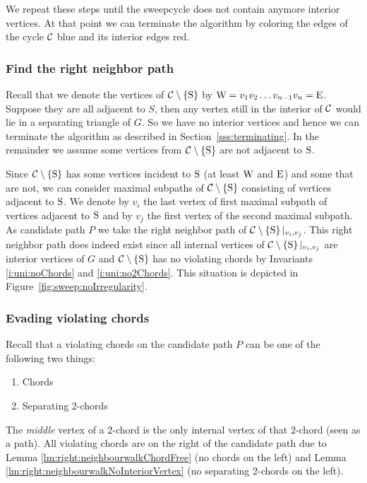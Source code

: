 We repeat these steps until the sweepcycle does not contain anymore interior vertices.
At that point we can terminate the algorithm by coloring the edges of the cycle $\mathcal{C}$ blue and its interior edges red.

\subsubsection{Find the right neighbor path}
  Recall that we denote the vertices of $\mathcal{C} \setminus \left\lbrace {\mathrm{S}} \right\rbrace$ by $\mathrm{W} =  v_1   v_2   \ldots v_{n-1}   v_n = \mathrm{E}$.
  Suppose they are all adjacent to $S$, then any vertex still in the interior of $\mathcal{C}$ would lie in a separating triangle of $G$. So we have no interior vertices and hence we can terminate the algorithm as described in Section~\ref{sss:terminating}.
  In the remainder we assume some vertices from $\mathcal{C} \setminus \left\lbrace {\mathrm{S}} \right\rbrace$ are not adjacent to $\mathrm{S}$.

  Since $\mathcal{C} \setminus \left\lbrace {\mathrm{S}} \right\rbrace$ has some vertices incident to $\mathrm{S}$ (at least $\mathrm{W}$ and $\mathrm{E}$) and some that are not, we can consider maximal subpaths of $\mathcal{C} \setminus \left\lbrace {\mathrm{S}} \right\rbrace$ consisting of vertices adjacent to $\mathrm{S}$.
  We denote by $v_i$ the last vertex of first maximal subpath of vertices adjacent to $\mathrm{S}$ and by $v_j$ the first vertex of the second maximal subpath.
  As candidate path $P$ we take the right neighbor path of $\mathcal{C} \setminus \left\lbrace {\mathrm{S}} \right\rbrace|_{v_i, v_j}$. This right neighbor path does indeed exist since all internal vertices of $\mathcal{C} \setminus \left\lbrace {\mathrm{S}} \right\rbrace|_{v_i, v_j}$ are interior vertices of $G$ and $\mathcal{C} \setminus \left\lbrace {\mathrm{S}} \right\rbrace$ has no violating chords by Invariants \ref{i:uni:noChords} and \ref{i:uni:no2Chords}.
  This situation is depicted in Figure~\ref{fig:sweep:noIrregularity}.

\subsubsection{Evading violating chords}
  Recall that a violating chords on the candidate path $P$ can be one of the following two things:
  \begin{enumerate}
    \itemsep=-4pt
    \item Chords
    \item Separating 2-chords
  \end{enumerate}

  The \emph{middle} vertex of a $2$-chord is the only internal vertex of that $2$-chord (seen as a path).
  All violating chords are on the right of the candidate path due to Lemma \ref{lm:right:neighbourwalkChordFree} (no chords on the left) and Lemma \ref{lm:right:neighbourwalkNoInteriorVertex} (no separating 2-chords on the left).

